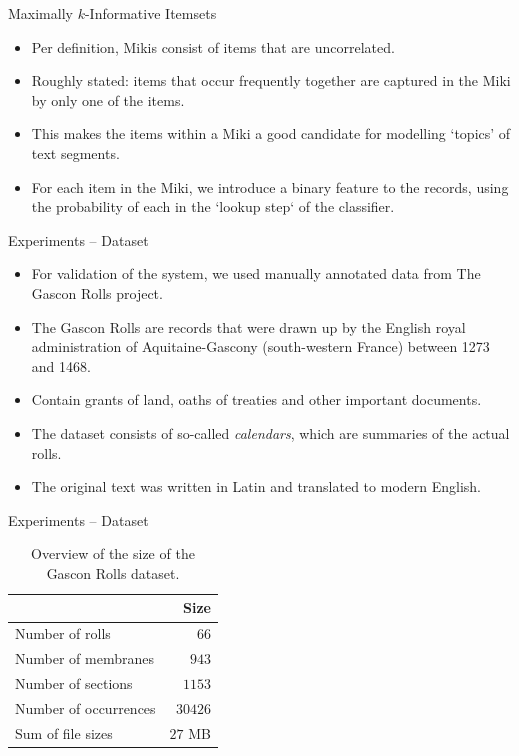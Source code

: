 \documentclass[12pt]{beamer}
\theoremstyle{break}
\begin{document}
\begin{frame}{Maximally $k$-Informative Itemsets}

	\begin{itemize}
		\item Per definition, Mikis consist of items that are uncorrelated.
		\item Roughly stated: items that occur frequently together are captured in the Miki by only one of the items.
		\item This makes the items within a Miki a good candidate for modelling `topics' of text segments.
		\item For each item in the Miki, we introduce a binary feature to the records, using the probability of each in the `lookup step` of the classifier.
	\end{itemize}
	
\end{frame}




\begin{frame}{Experiments -- Dataset}
	
	\begin{itemize}
		\item For validation of the system, we used manually annotated data from The Gascon Rolls project.
		\item The Gascon Rolls are records that were drawn up by the English royal administration of Aquitaine-Gascony (south-western France) between 1273 and 1468.
		\item Contain grants of land, oaths of treaties and other important documents.
		\item The dataset consists of so-called \emph{calendars}, which are summaries of the actual rolls.
		\item The original text was written in Latin and translated to modern English.
	\end{itemize}
	
\end{frame}




\begin{frame}{Experiments -- Dataset}

\begin{table}
    \centering
    \caption{Overview of the size of the Gascon Rolls dataset.}
    \label{tab:data_overview}
    \begin{tabular}{l r}
        \toprule
        & Size \\
        \midrule
        Number of rolls & $66$ \\
        Number of membranes & $943$ \\
        Number of sections & $1153$ \\
        Number of occurrences & $30426$ \\
        Sum of file sizes & $27$ MB \\
        \bottomrule
    \end{tabular}
\end{table}
	
\end{frame}
\end{document}

